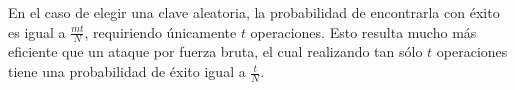 \documentclass[12pt,spanish,listoffigures,listoftables,listofalgorithms]{tfgetsinf}
\newcommand{\hash}{\textit{hash}}
\newcommand{\hashes}{\textit{hashes}}
\begin{document}
En el caso de elegir una clave aleatoria, la probabilidad de encontrarla con éxito es igual a $\frac{mt}{N}$, requiriendo únicamente $t$ operaciones. Esto resulta mucho más eficiente que un ataque por fuerza bruta, el cual realizando tan sólo $t$ operaciones tiene una probabilidad de éxito igual a $\frac{t}{N}$.



%
%    
%        
%        
%
%    
\end{document}
